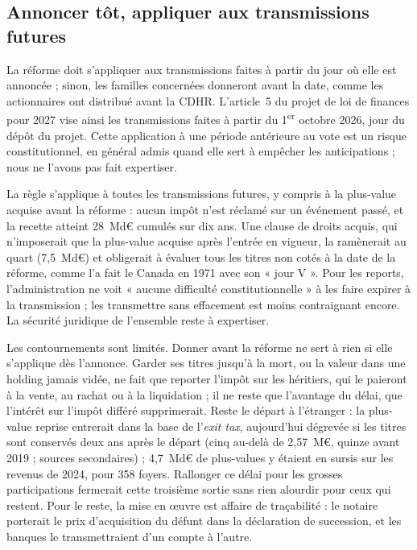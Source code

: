 \documentclass[11pt,a4paper]{article}
\begin{document}
\subsection{Annoncer tôt, appliquer aux transmissions futures}\label{sec:pfu_transition}

La réforme doit s'appliquer aux transmissions faites à partir du jour où elle est annoncée ; sinon, les familles
concernées donneront avant la date, comme les actionnaires ont distribué avant la CDHR. L'article~5 du projet de loi
de finances pour 2027 vise ainsi les transmissions faites à partir du 1\textsuperscript{er} octobre 2026, jour du
dépôt du projet. Cette application à une période antérieure au vote est un risque constitutionnel, en général admis
quand elle sert à empêcher les anticipations ; nous ne l'avons pas fait expertiser.

La règle s'applique à toutes les transmissions futures, y compris à la plus-value acquise avant la réforme : aucun
impôt n'est réclamé sur un événement passé, et la recette atteint 28~Md€ cumulés sur dix ans. Une clause de droits
acquis, qui n'imposerait que la plus-value acquise après l'entrée en vigueur, la ramènerait au quart (7,5~Md€) et
obligerait à évaluer tous les titres non cotés à la date de la réforme, comme l'a fait le Canada en 1971 avec son
« jour V ». Pour les reports, l'administration ne voit « aucune difficulté constitutionnelle » à les faire expirer à
la transmission ; les transmettre sans effacement est moins contraignant encore. La sécurité juridique de l'ensemble
reste à expertiser.

Les contournements sont limités. Donner avant la réforme ne sert à rien si elle s'applique dès l'annonce. Garder ses
titres jusqu'à la mort, ou la valeur dans une holding jamais vidée, ne fait que reporter l'impôt sur les héritiers,
qui le paieront à la vente, au rachat ou à la liquidation ; il ne reste que l'avantage du délai, que l'intérêt sur
l'impôt différé supprimerait. Reste le départ à l'étranger : la plus-value reprise entrerait dans la base de
l'\emph{exit tax}, aujourd'hui dégrevée si les titres sont conservés deux ans après le départ (cinq au-delà de
2,57~M€, quinze avant 2019 ; sources secondaires) ; 4,7~Md€ de plus-values y étaient en sursis sur les revenus de
2024, pour 358 foyers. Rallonger ce délai pour les grosses participations fermerait cette troisième sortie sans rien
alourdir pour ceux qui restent. Pour le reste, la mise en œuvre est affaire de traçabilité : le notaire porterait le
prix d'acquisition du défunt dans la déclaration de succession, et les banques le transmettraient d'un compte à
l'autre.
\end{document}
